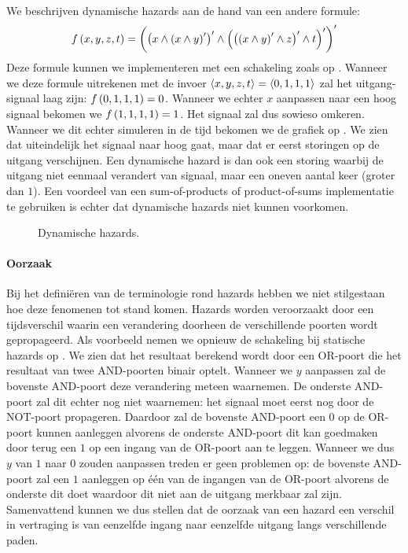 \paragraph{}
We beschrijven dynamische hazards aan de hand van een andere formule:
\begin{equation}
f\left( x,y,z,t \right)=\left( \left( x\wedge\left( x\wedge y \right)' \right)'\wedge\left( \left( \left( x \wedge y \right)'\wedge z \right)'\wedge t \right)' \right)'
\end{equation}
Deze formule kunnen we implementeren met een schakeling zoals op . Wanneer we deze formule uitrekenen met de invoer $\left\langle x,y,z,t \right\rangle=\left\langle 0,1,1,1 \right\rangle$ zal het uitgang-signaal laag zijn: $f\left( 0,1,1,1 \right)=0$. Wanneer we echter $x$ aanpassen naar een hoog signaal bekomen we $f\left( 1,1,1,1 \right)=1$. Het signaal zal dus sowieso omkeren. Wanneer we dit echter simuleren in de tijd bekomen we de grafiek op . We zien dat uiteindelijk het signaal naar hoog gaat, maar dat er eerst storingen op de uitgang verschijnen. Een dynamische hazard is dan ook een storing waarbij de uitgang niet eenmaal verandert van signaal, maar een oneven aantal keer (groter dan $1$). Een voordeel van een sum-of-products of product-of-sums implementatie te gebruiken is echter dat dynamische hazards niet kunnen voorkomen.
\begin{figure}[hbt]
\centering
{}
\caption{Dynamische hazards.}
\end{figure}
\paragraph{Oorzaak}
Bij het defini\"eren van de terminologie rond hazards hebben we niet stilgestaan hoe deze fenomenen tot stand komen. Hazards worden veroorzaakt door een tijdsverschil waarin een verandering doorheen de verschillende poorten wordt gepropageerd. Als voorbeeld nemen we opnieuw de schakeling bij statische hazards op . We zien dat het resultaat berekend wordt door een OR-poort die het resultaat van twee AND-poorten binair optelt. Wanneer we $y$ aanpassen zal de bovenste AND-poort deze verandering meteen waarnemen. De onderste AND-poort zal dit echter nog niet waarnemen: het signaal moet eerst nog door de NOT-poort propageren. Daardoor zal de bovenste AND-poort een $0$ op de OR-poort kunnen aanleggen alvorens de onderste AND-poort dit kan goedmaken door terug een $1$ op een ingang van de OR-poort aan te leggen. Wanneer we dus $y$ van $1$ naar $0$ zouden aanpassen treden er geen problemen op: de bovenste AND-poort zal een $1$ aanleggen op \'e\'en van de ingangen van de OR-poort alvorens de onderste dit doet waardoor dit niet aan de uitgang merkbaar zal zijn. Samenvattend kunnen we dus stellen dat de oorzaak van een hazard een verschil in vertraging is van eenzelfde ingang naar eenzelfde uitgang langs verschillende paden.
